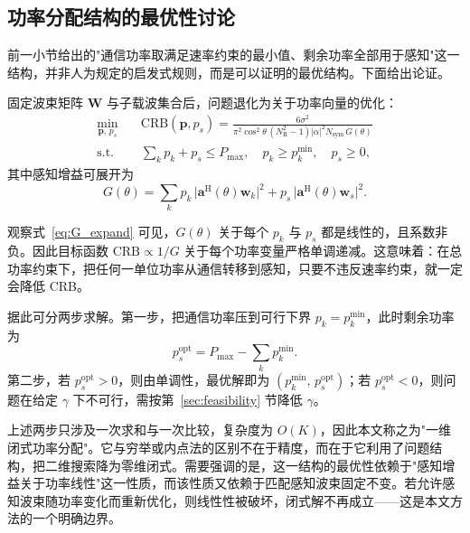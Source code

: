 \subsection{功率分配结构的最优性讨论}
\label{sec:power_opt}

前一小节给出的"通信功率取满足速率约束的最小值、剩余功率全部用于感知"这一结构，并非人为规定的启发式规则，而是可以证明的最优结构。下面给出论证。

固定波束矩阵 $\mathbf{W}$ 与子载波集合后，问题退化为关于功率向量的优化：
\begin{equation}
  \begin{aligned}
    \min_{\mathbf{p},\,p_{s}}\quad & \mathrm{CRB}(\mathbf{p},p_{s}) = \frac{6\sigma^{2}}{\pi^{2}\cos^{2}\theta\,(N_{\mathrm{R}}^{2}-1)\lvert\alpha\rvert^{2}N_{\mathrm{sym}}\,G(\theta)} \\
    \text{s.t.}\quad & \textstyle\sum_{k}p_{k} + p_{s} \le P_{\max},\quad p_{k}\ge p_{k}^{\min},\quad p_{s}\ge 0,
  \end{aligned}
  \label{eq:power_opt}
\end{equation}
其中感知增益可展开为
\begin{equation}
  G(\theta) = \sum_{k}p_{k}\,\lvert\mathbf{a}^{\mathrm{H}}(\theta)\mathbf{w}_{k}\rvert^{2} + p_{s}\,\lvert\mathbf{a}^{\mathrm{H}}(\theta)\mathbf{w}_{s}\rvert^{2}.
  \label{eq:G_expand}
\end{equation}

观察式~\eqref{eq:G_expand} 可见，$G(\theta)$ 关于每个 $p_{k}$ 与 $p_{s}$ 都是线性的，且系数非负。因此目标函数 $\mathrm{CRB}\propto 1/G$ 关于每个功率变量严格单调递减。这意味着：在总功率约束下，把任何一单位功率从通信转移到感知，只要不违反速率约束，就一定会降低 CRB。

据此可分两步求解。第一步，把通信功率压到可行下界 $p_{k} = p_{k}^{\min}$，此时剩余功率为
\begin{equation}
  p_{s}^{\mathrm{opt}} = P_{\max} - \sum_{k}p_{k}^{\min}.
  \label{eq:ps_opt}
\end{equation}
第二步，若 $p_{s}^{\mathrm{opt}} > 0$，则由单调性，最优解即为 $(p_{k}^{\min},\,p_{s}^{\mathrm{opt}})$；若 $p_{s}^{\mathrm{opt}} < 0$，则问题在给定 $\gamma$ 下不可行，需按第~\ref{sec:feasibility} 节降低 $\gamma$。

上述两步只涉及一次求和与一次比较，复杂度为 $O(K)$，因此本文称之为"一维闭式功率分配"。它与穷举或内点法的区别不在于精度，而在于它利用了问题结构，把二维搜索降为零维闭式。需要强调的是，这一结构的最优性依赖于"感知增益关于功率线性"这一性质，而该性质又依赖于匹配感知波束固定不变。若允许感知波束随功率变化而重新优化，则线性性被破坏，闭式解不再成立——这是本文方法的一个明确边界。

